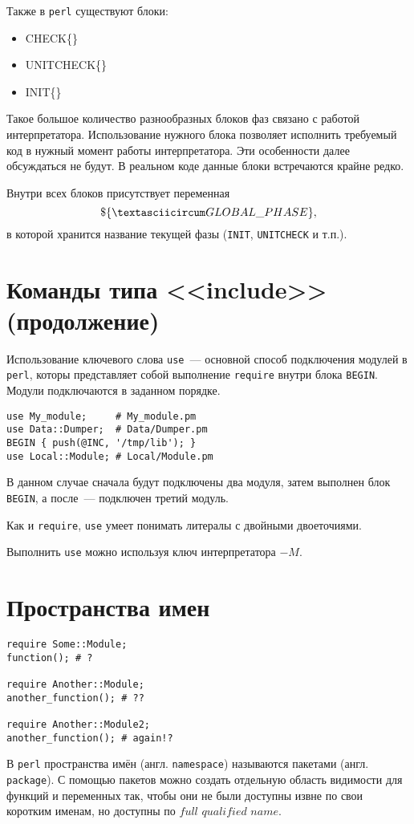 Также в \verb|perl| существуют блоки:
\begin{itemize}
	\item CHECK\{\}
	\item UNITCHECK\{\}
	\item INIT\{\}
\end{itemize}
Такое большое количество разнообразных блоков фаз связано с работой интерпретатора. Использование нужного блока позволяет исполнить требуемый код в нужный момент работы интерпретатора. Эти особенности далее обсуждаться не будут. В реальном коде данные блоки встречаются крайне редко.

Внутри всех блоков присутствует переменная
\[ \$\{ \textasciicircum GLOBAL \_ PHASE \}, \]
в которой хранится название текущей фазы (\verb|INIT|, \verb|UNITCHECK| и т.п.).

\section{Команды типа <<include>> (продолжение)} %
Использование ключевого слова \verb|use|~--- основной способ подключения модулей в \verb|perl|, которы представляет собой выполнение \verb|require| внутри блока \verb|BEGIN|. Модули подключаются в заданном порядке.
\begin{verbatim}
use My_module;     # My_module.pm
use Data::Dumper;  # Data/Dumper.pm
BEGIN { push(@INC, '/tmp/lib'); }
use Local::Module; # Local/Module.pm
\end{verbatim}
В данном случае сначала будут подключены два модуля, затем выполнен блок \verb|BEGIN|, а после~--- подключен третий модуль.

Как и \verb|require|, \verb|use| умеет понимать литералы с двойными двоеточиями.

Выполнить \verb|use| можно используя ключ интерпретатора $-M$.

\section{Пространства имен} %

\begin{verbatim}
require Some::Module;
function(); # ?

require Another::Module;
another_function(); # ??

require Another::Module2;
another_function(); # again!?
\end{verbatim}

В \verb|perl| пространства имён (англ. \verb|namespace|) называются пакетами (англ. \verb|package|). С помощью пакетов можно создать отдельную область видимости для функций и переменных так, чтобы они не были доступны извне по свои коротким именам, но доступны по $full$ $qualified$ $name$.

